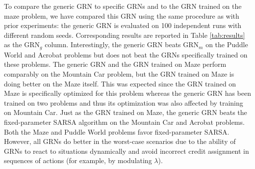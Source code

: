 To compare the generic GRN to specific GRNs and to the GRN trained on the maze problem, we have compared this GRN using the same procedure as with prior experiments: the generic GRN is evaluated on 100 independent runs with different random seeds. Corresponding results are reported in Table \ref{tab:results} as the GRN$_g$ column. Interestingly, the generic GRN beats GRN$_m$ on the Puddle World and Acrobat problems but does not beat the GRNs specifically trained on these problems. The generic GRN and the GRN trained on Maze perform comparably on the Mountain Car problem, but the GRN trained on Maze is doing better on the Maze itself. This was expected since the GRN trained on Maze is specifically optimized for this problem whereas the generic GRN has been trained on two problems and thus its optimization was also affected by training on Mountain Car. Just as the GRN trained on Maze, the generic GRN beats the fixed-parameter SARSA algorithm on the Mountain Car and Acrobat problems. Both the Maze and Puddle World problems favor fixed-parameter SARSA. However, all GRNs do better in the worst-case scenarios due to the ability of GRNs to react to situations dynamically and avoid incorrect credit assignment in sequences of actions (for example, by modulating $\lambda$).

